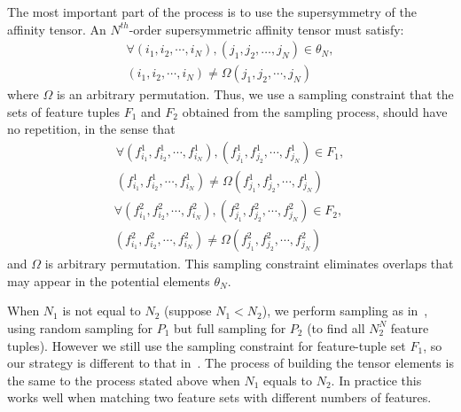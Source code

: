 The most important part of the  process is to use the supersymmetry of the affinity tensor.
An $N^{th}$-order supersymmetric affinity tensor must satisfy:
\begin{eqnarray}
\label{equ:noredun}
\forall (i_1,i_2,\cdots,i_N),(j_1,j_2,\ldots,j_N) \in \theta_N,\nonumber\\(i_1,i_2,\cdots,i_N)\neq\Omega(j_1,j_2,\cdots,j_N)
\end{eqnarray}
where $\Omega$ is an arbitrary permutation.
Thus, we use a sampling constraint that the sets of feature tuples $F_1$ and $F_2$ obtained from the sampling process, should have no repetition, in the sense that
\begin{eqnarray}
\label{equ:noredun2}
\forall (f_{i_1}^1,f_{i_2}^1,\cdots,f_{i_N}^1),(f_{j_1}^1,f_{j_2}^1,\cdots,f_{j_N}^1) \in F_1,\nonumber\\ (f_{i_1}^1,f_{i_2}^1,\cdots,f_{i_N}^1)\neq\Omega(f_{j_1}^1,f_{j_2}^1,\cdots,f_{j_N}^1)
\end{eqnarray}
\begin{eqnarray}
\label{equ:noredun3}
\forall (f_{i_1}^2,f_{i_2}^2,\cdots,f_{i_N}^2),(f_{j_1}^2,f_{j_2}^2,\cdots,f_{j_N}^2) \in F_2,\;\nonumber\\ (f_{i_1}^2,f_{i_2}^2,\cdots,f_{i_N}^2)\neq\Omega(f_{j_1}^2,f_{j_2}^2,\cdots,f_{j_N}^2)
\end{eqnarray}
and $\Omega$ is arbitrary permutation.
This sampling constraint eliminates overlaps that may appear in the potential elements $\theta_N$.

When $N_1$ is not equal to $N_2$ (suppose $N_1<N_2$), we perform sampling as in~\cite{Duchenne_etal09}, using random sampling for $P_1$  but full sampling for $P_2$ (to find all $N_2^N$ feature tuples). However we still use the
sampling constraint for feature-tuple set $F_1$, so our strategy is
different to that in~\cite{Duchenne_etal09}. The process of building the tensor elements is the same to the process stated above when $N_1$ equals to $N_2$. In practice this works well when matching two feature sets with different numbers of features.

